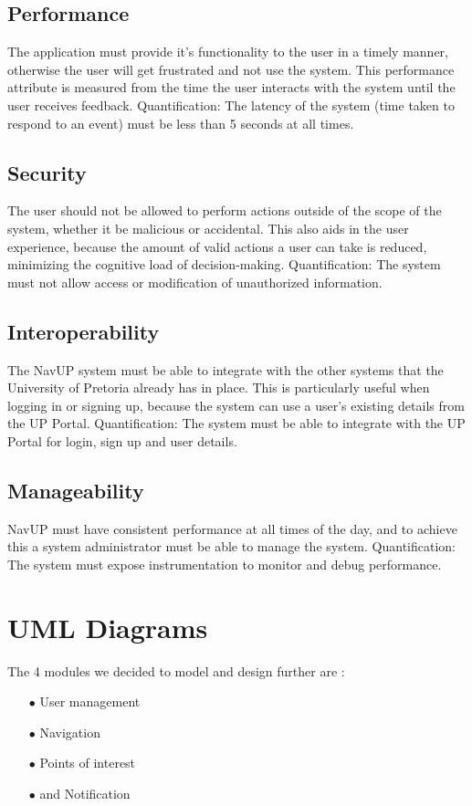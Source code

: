 \documentclass[english]{article}
\begin{document}
	\subsection{Performance}
	The application must provide it's functionality to the user in a timely manner, otherwise the user will get frustrated and not use the system. This performance attribute is measured from the time the user interacts with the system until the user receives feedback.
	\newline
	\newline
	{Quantification:} The latency of the system (time taken to respond to an event) must be less than 5 seconds at all times.
	\subsection{Security}
	The user should not be allowed to perform actions outside of the scope of the system, whether it be malicious or accidental. This also aids in the user experience, because the amount of valid actions a user can take is reduced, minimizing the cognitive load of decision-making.
	\newline
	\newline
	{Quantification:} The system must not allow access or modification of unauthorized information.
	\subsection{Interoperability}
	The NavUP system must be able to integrate with the other systems that the University of Pretoria already has in place. This is particularly useful when logging in or signing up, because the system can use a user's existing details from the UP Portal.
	\newline
	\newline
	{Quantification:} The system must be able to integrate with the UP Portal for login, sign up and user details.
	
	\subsection{Manageability}
	NavUP must have consistent performance at all times of the day, and to achieve this a system administrator must be able to manage the system.
	\newline
	\newline
	{Quantification:} The system must expose instrumentation to monitor and debug performance.
	
	\section{UML Diagrams}
	The 4 modules we decided to model and design further are :
	\begin{itemize}
		\item[$\bullet$] User management
		\item[$\bullet$] Navigation
		\item[$\bullet$] Points of interest
		\item[$\bullet$] and Notification
	\end{itemize}
\end{document}

